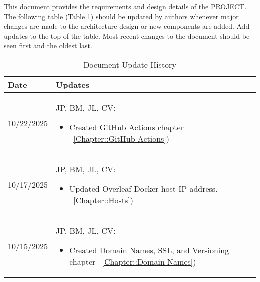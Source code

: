 This document provides the requirements and design details of the
PROJECT.  The following table (Table \ref{Table::UpdateHistory}) should be
updated by authors whenever major changes are made to the architecture
design or new components are added. Add updates to the top of the table.  
Most recent changes to the document should be seen first and the oldest 
last.


\begin{longtable}{|l||p{13.5cm}|}
\caption{Document Update History \label{Table::UpdateHistory}}\\
\hline
\textbf{Date} & \textbf{Updates} \\
\hline 
\endhead

10/22/2025 & JP, BM, JL, CV:
\begin{itemize}[topsep=0pt,itemsep=0pt,parsep=0pt,partopsep=0pt,leftmargin=12pt]
\item Created GitHub Actions chapter
~\ref{Chapter::GitHub Actions})
\end{itemize} 
\\ \hline

10/17/2025 & JP, BM, JL, CV:
\begin{itemize}[topsep=0pt,itemsep=0pt,parsep=0pt,partopsep=0pt,leftmargin=12pt]
\item Updated Overleaf Docker host IP address.
~\ref{Chapter::Hosts})
\end{itemize} 
\\ \hline


10/15/2025 & JP, BM, JL, CV:
\begin{itemize}[topsep=0pt,itemsep=0pt,parsep=0pt,partopsep=0pt,leftmargin=12pt]
\item Created Domain Names, SSL, and Versioning chapter
~\ref{Chapter::Domain Names})
\end{itemize} 
\\ \hline


\end{longtable}
